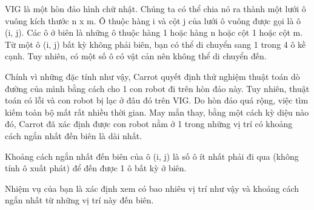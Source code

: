 VIG là một hòn đảo hình chữ nhật. Chúng ta có thể chia nó ra thành  một lưới ô vuông kích thước n x m. Ô thuộc hàng i và cột j của lưới ô  vuông được gọi là ô (i, j). Các ô ở biên là những ô thuộc hàng 1 hoặc  hàng n hoặc cột 1 hoặc cột m. Từ một ô (i, j) bất kỳ không phải biên,  bạn có thể di chuyển sang 1 trong 4 ô kề cạnh. Tuy nhiên, có một số ô có  vật cản nên không thể di chuyển đến.

Chính vì những đặc tính như  vậy, Carrot quyết định thử nghiệm thuật toán dò đường của mình bằng cách  cho 1 con robot đi trên hòn đảo này. Tuy nhiên, thuật toán có lỗi và  con robot bị lạc ở đâu đó trên VIG. Do hòn đảo quá rộng, việc tìm kiếm  toàn bộ mất rất nhiều thời gian. May mắn thay, bằng một cách kỳ diệu nào  đó, Carrot đã xác định được con robot nằm ở 1 trong những vị trí có  khoảng cách ngắn nhất đến biên là dài nhất.

Khoảng cách ngắn nhất đến biên của ô (i, j) là số ô ít nhất phải đi qua (không tính ô xuất phát) để đến được 1 ô bất kỳ ở biên.

Nhiệm vụ của bạn là xác định xem có bao nhiêu vị trí như vậy và khoảng cách ngắn nhất từ những vị trí này đến biên.